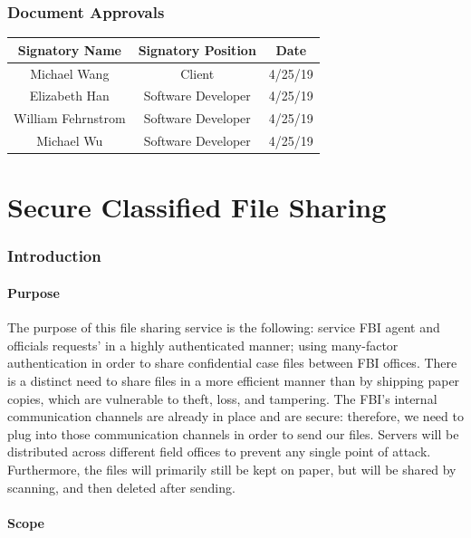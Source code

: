 \documentclass[12pt]{article}
\begin{document}
\section{Document Approvals}

\begin{center}
    \begin{tabular}{|c|c|c|}
        \hline
        Signatory Name & Signatory Position & Date \\ \hline
        Michael Wang & Client & 4/25/19 \\ \hline
        Elizabeth Han & Software Developer & 4/25/19 \\ \hline
        William Fehrnstrom & Software Developer & 4/25/19 \\ \hline
        Michael Wu & Software Developer & 4/25/19 \\ \hline
    \end{tabular}
\end{center}

\pagebreak
\part{Secure Classified File Sharing}

\section{Introduction}

\subsection{Purpose}

The purpose of this file sharing service is the following: service FBI agent and officials requests'
in a highly authenticated manner; using many-factor authentication in order to share confidential case
files between FBI offices. There is a distinct need to share files in a more efficient manner than by
shipping paper copies, which are vulnerable to theft, loss, and tampering. The FBI's internal communication
channels are already in place and are secure: therefore, we need to plug into those communication channels
in order to send our files. Servers will be distributed across different field offices to prevent any single
point of attack. Furthermore, the files will primarily still be kept on paper, but will be shared by scanning,
and then deleted after sending.

\subsection{Scope}
\end{document}
